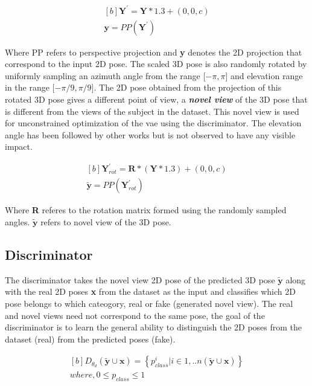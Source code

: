 \begin{equation} \label{eqn:proj_direct}
    \begin{gathered}[b]
        \textbf{Y}^\prime = \textbf{Y}*1.3 + (0,0,c) \\
        \textbf{y} = PP(\textbf{Y}^\prime)
    \end{gathered}
\end{equation}

Where PP refers to perspective projection and \textbf{y} denotes the 2D projection that correspond to the input 2D pose. The scaled 3D pose is also randomly rotated by uniformly sampling an azimuth angle from the range [$-\pi, \pi$] and elevation range in the range [$-\pi/9, \pi/9$]. The 2D pose obtained from the projection of this rotated 3D pose gives a different point of view, a \textbf{\textit{novel view}} of the 3D pose that is different from the views of the subject in the dataset. This novel view is used for unconstrained optimization of the \ac{vae} using the discriminator. The elevation angle has been followed by other works but is not observed to have any visible impact.

\begin{equation} \label{eqn:proj_rotated}
    \begin{gathered}[b]
        \textbf{Y}^\prime_{rot} = \textbf{R} * (\textbf{Y}*1.3) + (0,0,c) \\
        \tilde{\textbf{y}} = PP(\textbf{Y}^\prime_{rot})
    \end{gathered}
\end{equation}

Where \textbf{R} referes to the rotation matrix formed using the randomly sampled angles. $\tilde{\textbf{y}}$ refers to novel view of the 3D pose.

\subsection{Discriminator}
The discriminator takes the novel view 2D pose of the predicted 3D pose $\tilde{\textbf{y}}$ along with the real 2D poses \textbf{x} from the dataset as the input and classifies which 2D pose belongs to which cateogory, real or fake (generated novel view). The real and novel views need not correspond to the same pose, the goal of the discriminator is to learn the general ability to distinguish the 2D poses from the dataset (real) from the predicted poses (fake).

\begin{equation} \label{eqn:proj_rotated}
    \begin{gathered}[b]
        D_{\theta_d}(\tilde{\textbf{y}} \cup \textbf{x}) = \left\lbrace p_{class}^i | i \in {1, .. n(\tilde{\textbf{y}} \cup \textbf{x})}\right\rbrace \\
        where, 0\leq p_{class} \leq 1
    \end{gathered}
\end{equation}

